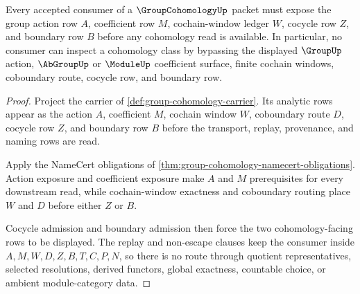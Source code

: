 \begin{theorem}
\label{thm:group-cohomology-cocycle-boundary-route}
Every accepted consumer of a $\GroupCohomologyUp$ packet must expose the group action row $A$, coefficient row $M$, cochain-window ledger $W$, cocycle row $Z$, and boundary row $B$ before any cohomology read is available. In particular, no consumer can inspect a cohomology class by bypassing the displayed $\GroupUp$ action, $\AbGroupUp$ or $\ModuleUp$ coefficient surface, finite cochain windows, coboundary route, cocycle row, and boundary row.
\end{theorem}
\begin{proof}
Project the carrier of \autoref{def:group-cohomology-carrier}. Its analytic rows appear as the action $A$, coefficient $M$, cochain window $W$, coboundary route $D$, cocycle row $Z$, and boundary row $B$ before the transport, replay, provenance, and naming rows are read.

Apply the NameCert obligations of \autoref{thm:group-cohomology-namecert-obligations}. Action exposure and coefficient exposure make $A$ and $M$ prerequisites for every downstream read, while cochain-window exactness and coboundary routing place $W$ and $D$ before either $Z$ or $B$.

Cocycle admission and boundary admission then force the two cohomology-facing rows to be displayed. The replay and non-escape clauses keep the consumer inside $A,M,W,D,Z,B,T,C,P,N$, so there is no route through quotient representatives, selected resolutions, derived functors, global exactness, countable choice, or ambient module-category data.
\end{proof}


\begin{closurestatus}{\GroupCohomologyUp}
  \theoryclosure{\seedClosure}
  \formalstatus{\unformalizedV}
\end{closurestatus}
